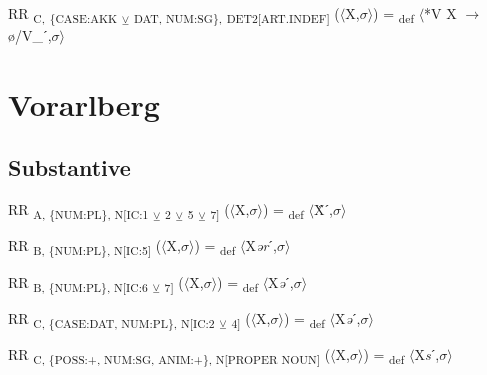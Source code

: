 {\begin{exe}
 RR \textsubscript{C,} \textsubscript{\{CASE:AKK} \textsubscript{${\veebar}$}\textsubscript{ DAT, NUM:SG\},} \textsubscript{DET2[ART.INDEF]} ($\langle$X,$\sigma $$\rangle$) = \textsubscript{def} $\langle$*V X $\rightarrow$ ø/V\_ˊ,$\sigma $$\rangle$
\end{exe}

\section{Vorarlberg}

\subsection{Substantive}

\begin{exe}
 RR \textsubscript{A, \{NUM:PL\}, N[IC:1} \textsubscript{${\veebar}$}\textsubscript{ 2} \textsubscript{${\veebar}$}\textsubscript{ 5} \textsubscript{${\veebar}$}\textsubscript{ 7]} ($\langle$X,$\sigma $$\rangle$) = \textsubscript{def} $\langle$Ẍˊ,$\sigma $$\rangle$
\end{exe}

\begin{exe}
 RR \textsubscript{B, \{NUM:PL\}, N[IC:5]} ($\langle$X,$\sigma $$\rangle$) = \textsubscript{def} $\langle$X\textit{ər}ˊ,$\sigma $$\rangle$
\end{exe}

\begin{exe}
 RR \textsubscript{B, \{NUM:PL\}, N[IC:6} \textsubscript{${\veebar}$}\textsubscript{ 7]} ($\langle$X,$\sigma $$\rangle$) = \textsubscript{def} $\langle$X\textit{ə}ˊ,$\sigma $$\rangle$
\end{exe}

\begin{exe}
 RR \textsubscript{C, \{CASE:DAT, NUM:PL\}, N[IC:2} \textsubscript{${\veebar}$}\textsubscript{ 4]} ($\langle$X,$\sigma $$\rangle$) = \textsubscript{def} $\langle$X\textit{ə}ˊ,$\sigma $$\rangle$
\end{exe}

\begin{exe}
 RR \textsubscript{C, \{POSS:+, NUM:SG, ANIM:+\}, N[}\textsubscript{PROPER NOUN}\textsubscript{]} ($\langle$X,$\sigma $$\rangle$) = \textsubscript{def} $\langle$X\textit{s}ˊ,$\sigma $$\rangle$
\end{exe}

}
